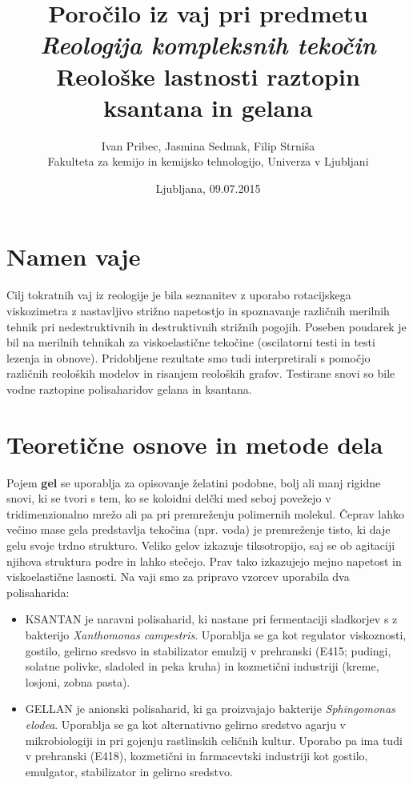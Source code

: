 \documentclass{article}
\begin{document}
\author{Ivan Pribec, Jasmina Sedmak, Filip Strniša\\
Fakulteta za kemijo in kemijsko tehnologijo, Univerza v Ljubljani}
\date{Ljubljana, 09.07.2015}
\title{Poročilo iz vaj pri predmetu \textit{Reologija kompleksnih tekočin}\\
Reološke lastnosti raztopin ksantana in gelana}
\maketitle


\section{Namen vaje}
Cilj tokratnih vaj iz reologije je bila seznanitev z uporabo rotacijskega viskozimetra z nastavljivo strižno napetostjo in spoznavanje različnih merilnih tehnik pri nedestruktivnih in destruktivnih strižnih pogojih. Poseben poudarek je bil na merilnih tehnikah za viskoelastične tekočine (oscilatorni testi in testi lezenja in obnove). Pridobljene rezultate smo tudi interpretirali s pomočjo različnih reoloških modelov in risanjem reoloških grafov. Testirane snovi so bile vodne raztopine polisaharidov gelana in ksantana.

\section{Teoretične osnove in metode dela}

Pojem \textbf{gel} se uporablja za opisovanje želatini podobne, bolj ali manj rigidne snovi, ki se tvori s tem, ko se koloidni delčki med seboj povežejo v tridimenzionalno mrežo ali pa pri premreženju polimernih molekul. Čeprav lahko večino mase gela predstavlja tekočina (npr. voda) je premreženje tisto, ki daje gelu svoje trdno strukturo. Veliko gelov izkazuje tiksotropijo, saj se ob agitaciji njihova struktura podre in lahko stečejo. Prav tako izkazujejo mejno napetost in viskoelastične lasnosti.
Na vaji smo za pripravo vzorcev uporabila dva polisaharida:
\begin{itemize}
\item KSANTAN je naravni polisaharid, ki nastane pri fermentaciji sladkorjev s z bakterijo \textit{Xanthomonas campestris}. Uporablja se ga kot regulator viskoznosti, gostilo, gelirno sredsvo in stabilizator emulzij v prehranski (E415; pudingi, solatne polivke, sladoled in peka kruha) in kozmetični industriji (kreme, losjoni, zobna pasta).
 \item GELLAN je anionski polisaharid, ki ga proizvajajo bakterije \textit{Sphingomonas elodea}. Uporablja se ga kot alternativno gelirno sredstvo agarju v mikrobiologiji in pri gojenju rastlinskih celičnih kultur. Uporabo pa ima tudi v prehranski (E418), kozmetični in farmacevtski industriji kot gostilo, emulgator, stabilizator in gelirno sredstvo.
\end{itemize}
\end{document}
